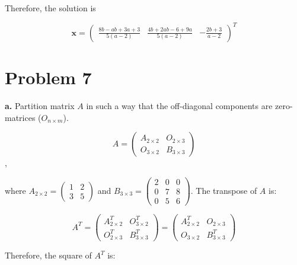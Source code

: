 \documentclass{article}
\begin{document}
Therefore, the solution is

\begin{equation*}
  \mathbf{x} =
  \begin{pmatrix}
    \frac{8b-ab+3a+3}{5(a-2)} & \frac{4b + 2ab - 6 + 9a}{5(a-2)} & -\frac{2b + 3}{a - 2}
  \end{pmatrix}^{T}
\end{equation*}

\section{Problem 7}

\textbf{a.} Partition matrix $A$ in such a way that the off-diagonal components are zero-matrices ($O_{n \times m}$).

\begin{equation*}
  A = \left(
  \begin{array}{c|c}
    A_{2\times2} & O_{2\times3} \\
    \hline
    O_{3\times2} & B_{3 \times 3}
  \end{array}
  \right)
\end{equation*},

where $A_{2 \times 2} =
\begin{pmatrix}
  1 & 2 \\
  3 & 5
\end{pmatrix}
$ and $B_{3 \times 3} =
\begin{pmatrix}
  2 & 0 & 0 \\
  0 & 7 & 8 \\
  0 & 5 & 6
\end{pmatrix}
$. The transpose of $A$ is:

\begin{equation*}
  A^{T} = \left(
  \begin{array}{c|c}
    A_{2\times2}^{T} & O_{3\times2}^{T} \\
    \hline
    O_{2\times3}^{T} & B_{3 \times 3}^{T}
  \end{array}
\right) =
\left(
  \begin{array}{c|c}
    A_{2\times2}^{T} & O_{2\times3} \\
    \hline
    O_{3\times2} & B_{3 \times 3}^{T}
  \end{array}
  \right)
\end{equation*}

Therefore, the square of $A^{T}$ is:
\end{document}
